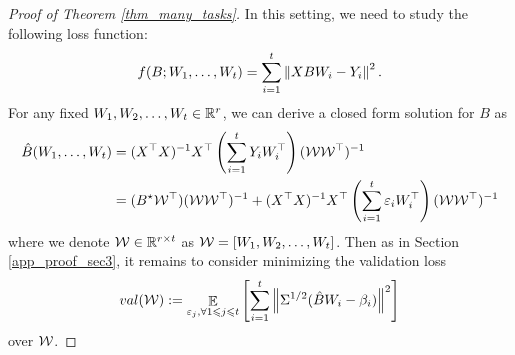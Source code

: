 \begin{proof}[Proof of Theorem \ref{thm_many_tasks}]
In this setting, we need to study the following loss function:
\begin{align}
	f(B; W_1, \dots, W_t) = \sum_{i=1}^t \bignorm{X B W_i - Y_i}^2. \label{eq_mtl_same_cov}
\end{align}
For any fixed $W_1, W_2, \dots, W_t \in \R^r$, we can derive a closed form solution for $B$ as
	\begin{align*}
		\hat{B}(W_1, \dots, W_t) &= (X^{\top}X)^{-1} X^{\top} \bigbrace{\sum_{i=1}^t Y_i W_i^{\top}} (\cal W  \cal W^{\top})^{-1} \\
		&= (B^\star \cal W ^{\top}) (\cal W \cal W ^{\top})^{-1} + (X^{\top}X)^{-1}X^{\top} \bigbrace{\sum_{i=1}^t \varepsilon_i W_i^{\top}} (\cal W \cal W^{\top})^{-1}
	\end{align*}
	where we denote $\cal W \in\real^{r\times t}$ as $\cal W=[W_1, W_2, \dots, W_t]$.
	Then as in Section \ref{app_proof_sec3}, it remains to consider minimizing the validation loss 
	$$\val( \cal W):=\exarg{\varepsilon_j, \forall 1\le j\le t}{ \sum_{i=1}^t \bignorm{\Sigma^{1/2}( \hat B W_i - \beta_i)}^2}$$ 
	over $\cal W$.


\end{proof}

